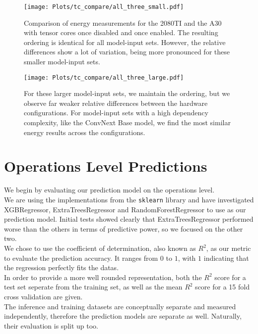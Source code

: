 \begin{figure}
    \center\texttt{[image: Plots/tc\_compare/all\_three\_small.pdf]}
    \caption{Comparison of energy measurements for the 2080TI and the A30 with tensor cores once disabled and once enabled. The resulting ordering is identical for all model-input sets. However, the relative differences show a lot of variation, being more pronounced for these smaller model-input sets.}
    \label{fig:tcnotcsmall}
    \texttt{[image: Plots/tc\_compare/all\_three\_large.pdf]}
    \caption{For these larger model-input sets, we maintain the ordering, but we observe far weaker relative differences between the hardware configurations. For model-input sets with a high dependency complexity, like the ConvNext Base model, we find the most similar energy results across the configurations.}
    \label{fig:tcnotclarge}
\end{figure}

\FloatBarrier


\section{Operations Level Predictions}



We begin by evaluating our prediction model on the operations level. \\
We are using the implementations from the \texttt{sklearn} library and have investigated XGBRegressor, ExtraTreesRegressor and RandomForestRegressor to use as our prediction model. Initial tests showed clearly that ExtraTreesRegressor performed worse than the others in terms of predictive power, so we focused on the other two. \\
We chose to use the coefficient of determination, also known as $R^2$, as our metric to evaluate the prediction accuracy. It ranges from $0$ to $1$, with $1$ indicating that the regression perfectly fits the datas. \\
In order to provide a more well rounded representation, both the $R^2$ score for a test set seperate from the training set, as well as the mean $R^2$ score for a 15 fold cross validation are given. \\
The inference and training datasets are conceptually separate and measured independently, therefore the prediction models are separate as well. Naturally, their evaluation is split up too.


